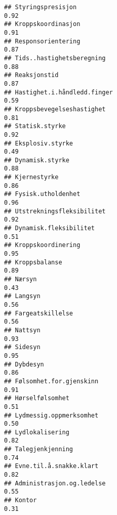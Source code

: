 \documentclass[
]{article}
\begin{document}
\begin{verbatim}
## Styringspresisjon                                                                0.92
## Kroppskoordinasjon                                                               0.91
## Responsorientering                                                               0.87
## Tids..hastighetsberegning                                                        0.88
## Reaksjonstid                                                                     0.87
## Hastighet.i.håndledd.finger                                                      0.59
## Kroppsbevegelseshastighet                                                        0.81
## Statisk.styrke                                                                   0.92
## Eksplosiv.styrke                                                                 0.49
## Dynamisk.styrke                                                                  0.88
## Kjernestyrke                                                                     0.86
## Fysisk.utholdenhet                                                               0.96
## Utstrekningsfleksibilitet                                                        0.92
## Dynamisk.fleksibilitet                                                           0.51
## Kroppskoordinering                                                               0.95
## Kroppsbalanse                                                                    0.89
## Nærsyn                                                                           0.43
## Langsyn                                                                          0.56
## Fargeatskillelse                                                                 0.56
## Nattsyn                                                                          0.93
## Sidesyn                                                                          0.95
## Dybdesyn                                                                         0.86
## Følsomhet.for.gjenskinn                                                          0.91
## Hørselfølsomhet                                                                  0.51
## Lydmessig.oppmerksomhet                                                          0.50
## Lydlokalisering                                                                  0.82
## Talegjenkjenning                                                                 0.74
## Evne.til.å.snakke.klart                                                          0.82
## Administrasjon.og.ledelse                                                        0.55
## Kontor                                                                           0.31

\end{verbatim}
\end{document}
